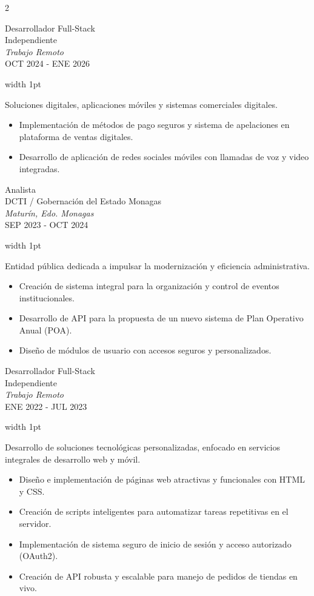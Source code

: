 \documentclass[9pt, a4paper]{article}
\newcommand{\CVExpMeta}[4]{
    {\noindent
    {\PlexMedium\color{CVPrimary} #1} \\
    {\PlexSans #2} \\
    {\PlexLight\itshape #3} \\
    {\PlexExtraLight #4}}
    \vspace{0.85cm}
}
\newcommand{\CVExpBody}[1]{
    \noindent
    \textcolor{CVLine}{\vrule width 1pt} \hspace{1cm}
    \begin{minipage}[t]{0.92\linewidth}
        \raggedright {\DMSansLight #1}
    \end{minipage}
    \vspace{0.8cm}
}
\begin{document}
\setlength{\columnsep}{1.6cm}
\begin{paracol}{2}

\CVExpMeta{Desarrollador Full-Stack}
{Independiente}
{Trabajo Remoto}
{OCT 2024 - ENE 2026}
\switchcolumn
\CVExpBody{
Soluciones digitales, aplicaciones móviles y sistemas comerciales digitales.
\begin{itemize}[label=\textcolor{CVBullet}{–}, leftmargin=0.5cm, topsep=0.4cm, itemsep=0.15cm]
    \item Implementación de métodos de pago seguros y sistema de apelaciones en plataforma de ventas digitales.
    \item Desarrollo de aplicación de redes sociales móviles con llamadas de voz y video integradas.
\end{itemize}
}
\switchcolumn*

\CVExpMeta{Analista}
{DCTI / Gobernación del Estado Monagas}
{Maturín, Edo. Monagas}
{SEP 2023 - OCT 2024}
\switchcolumn
\CVExpBody{
Entidad pública dedicada a impulsar la modernización y eficiencia administrativa.
\begin{itemize}[label=\textcolor{CVBullet}{–}, leftmargin=0.5cm, topsep=0.4cm, itemsep=0.15cm]
    \item Creación de sistema integral para la organización y control de eventos institucionales.
    \item Desarrollo de API para la propuesta de un nuevo sistema de Plan Operativo Anual (POA).
    \item Diseño de módulos de usuario con accesos seguros y personalizados.
\end{itemize}
}
\switchcolumn*

\CVExpMeta{Desarrollador Full-Stack}
{Independiente}
{Trabajo Remoto}
{ENE 2022 - JUL 2023}
\switchcolumn
\CVExpBody{
Desarrollo de soluciones tecnológicas personalizadas, enfocado en servicios integrales de desarrollo web y móvil.
\begin{itemize}[label=\textcolor{CVBullet}{–}, leftmargin=0.5cm, topsep=0.4cm, itemsep=0.15cm]
    \item Diseño e implementación de páginas web atractivas y funcionales con HTML y CSS.
    \item Creación de scripts inteligentes para automatizar tareas repetitivas en el servidor.
    \item Implementación de sistema seguro de inicio de sesión y acceso autorizado (OAuth2).
    \item Creación de API robusta y escalable para manejo de pedidos de tiendas en vivo.
\end{itemize}
}

\end{paracol}
\end{document}
